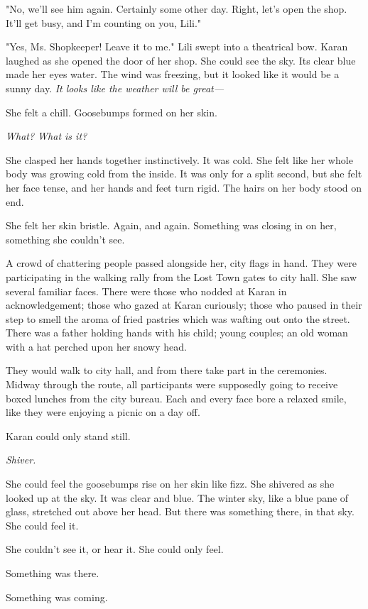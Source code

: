 "No, we'll see him again. Certainly some other day. Right, let's open
the shop. It'll get busy, and I'm counting on you, Lili."

"Yes, Ms. Shopkeeper! Leave it to me." Lili swept into a theatrical bow.
Karan laughed as she opened the door of her shop. She could see the sky.
Its clear blue made her eyes water. The wind was freezing, but it looked
like it would be a sunny day. \emph{It looks like the weather will be great---}

She felt a chill. Goosebumps formed on her skin.

\emph{What? What is it?}

She clasped her hands together instinctively. It was cold. She felt like
her whole body was growing cold from the inside. It was only for a split
second, but she felt her face tense, and her hands and feet turn rigid.
The hairs on her body stood on end.

She felt her skin bristle. Again, and again. Something was closing in on
her, something she couldn't see.

A crowd of chattering people passed alongside her, city flags in hand.
They were participating in the walking rally from the Lost Town gates to
city hall. She saw several familiar faces. There were those who nodded
at Karan in acknowledgement; those who gazed at Karan curiously; those
who paused in their step to smell the aroma of fried pastries which was
wafting out onto the street. There was a father holding hands with his
child; young couples; an old woman with a hat perched upon her snowy
head.

They would walk to city hall, and from there take part in the
ceremonies. Midway through the route, all participants were supposedly
going to receive boxed lunches from the city bureau. Each and every face
bore a relaxed smile, like they were enjoying a picnic on a day off.

Karan could only stand still.

\emph{Shiver.}

She could feel the goosebumps rise on her skin like fizz. She shivered
as she looked up at the sky. It was clear and blue. The winter sky, like
a blue pane of glass, stretched out above her head. But there was
something there, in that sky. She could feel it.

She couldn't see it, or hear it. She could only feel.

Something was there.

Something was coming.

